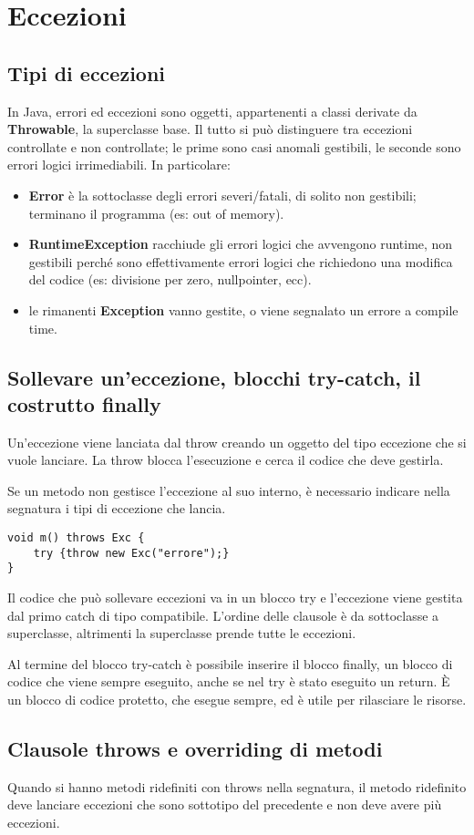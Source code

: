 \chapter{Eccezioni}

\section{Tipi di eccezioni}
In Java, errori ed eccezioni sono oggetti, appartenenti a classi derivate da \textbf{Throwable}, la superclasse base. Il tutto si può distinguere tra eccezioni controllate e non controllate; le prime sono casi anomali gestibili, le seconde sono errori logici irrimediabili.
In particolare:
\begin{itemize}
\item \textbf{Error} è la sottoclasse degli errori severi/fatali, di solito non gestibili; terminano il programma (es: out of memory).
\item \textbf{RuntimeException} racchiude gli errori logici che avvengono runtime, non gestibili perché sono effettivamente errori logici che richiedono una modifica del codice (es: divisione per zero, nullpointer, ecc).
\item le rimanenti \textbf{Exception} vanno gestite, o viene segnalato un errore a compile time.
\end{itemize}

\section{Sollevare un'eccezione, blocchi try-catch, il costrutto finally}
Un'eccezione viene lanciata dal throw creando un oggetto del tipo eccezione che si vuole lanciare. La throw blocca l'esecuzione e cerca il codice che deve gestirla.

Se un metodo non gestisce l'eccezione al suo interno, è necessario indicare nella segnatura i tipi di eccezione che lancia.
\begin{lstlisting}
void m() throws Exc {
    try {throw new Exc("errore");}
}
\end{lstlisting}
Il codice che può sollevare eccezioni va in un blocco try e l'eccezione viene gestita dal primo catch di tipo compatibile. L'ordine delle clausole è da sottoclasse a superclasse, altrimenti la superclasse prende tutte le eccezioni.

Al termine del blocco try-catch è possibile inserire il blocco finally, un blocco di codice che viene sempre eseguito, anche se nel try è stato eseguito un return. È un blocco di codice protetto, che esegue sempre, ed è utile per rilasciare le risorse.

\section{Clausole throws e overriding di metodi}
Quando si hanno metodi ridefiniti con throws nella segnatura, il metodo ridefinito deve lanciare eccezioni che sono sottotipo del precedente e non deve avere più eccezioni. 



